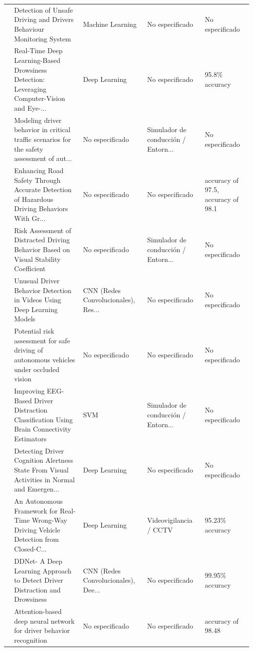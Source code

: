 \begin{table}[htbp]
\begin{tabular}{cp{7.5cm}p{2.8cm}p{2.8cm}p{2.8cm}}
\cite{domala2023unsafe} & Detection of Unsafe Driving and Drivers Behaviour Monitoring System & Machine Learning & No especificado & No especificado \\
\cite{safarov2023realtime} & Real-Time Deep Learning-Based Drowsiness Detection: Leveraging Computer-Vision and Eye-... & Deep Learning & No especificado & 95.8\% accuracy \\
\cite{fries2023modeling} & Modeling driver behavior in critical traffic scenarios for the safety assessment of aut... & No especificado & Simulador de conducción / Entorn... & No especificado \\
\cite{khosravinia2023enhancing} & Enhancing Road Safety Through Accurate Detection of Hazardous Driving Behaviors With Gr... & No especificado & No especificado & accuracy of 97.5, accuracy of 98.1 \\
\cite{wang2023risk} & Risk Assessment of Distracted Driving Behavior Based on Visual Stability Coefficient & No especificado & Simulador de conducción / Entorn... & No especificado \\
\cite{savkin2022unusual} & Unusual Driver Behavior Detection in Videos Using Deep Learning Models & CNN (Redes Convolucionales), Res... & No especificado & No especificado \\
\cite{wang2022potential} & Potential risk assessment for safe driving of autonomous vehicles under occluded vision & No especificado & No especificado & No especificado \\
\cite{perera2022improving} & Improving EEG-Based Driver Distraction Classification Using Brain Connectivity Estimators & SVM & Simulador de conducción / Entorn... & No especificado \\
\cite{luo2022detecting} & Detecting Driver Cognition Alertness State From Visual Activities in Normal and Emergen... & Deep Learning & No especificado & No especificado \\
\cite{suttiponpisarn2022autonomous} & An Autonomous Framework for Real-Time Wrong-Way Driving Vehicle Detection from Closed-C... & Deep Learning & Videovigilancia / CCTV & 95.23\% accuracy \\
\cite{panwar2022ddnet} & DDNet- A Deep Learning Approach to Detect Driver Distraction and Drowsiness & CNN (Redes Convolucionales), Dee... & No especificado & 99.95\% accuracy \\
\cite{xiao2022attentionbased} & Attention-based deep neural network for driver behavior recognition & No especificado & No especificado & accuracy of 98.48 \\

\end{tabular}
\end{table}
